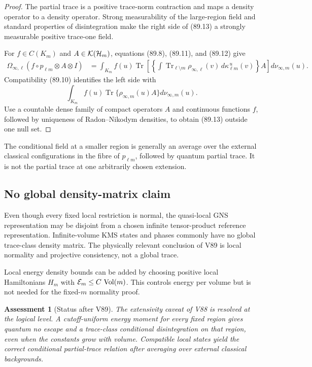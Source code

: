 \documentclass[11pt]{article}
\newtheorem{assessment}[theorem]{Assessment}
\theoremstyle{remark}
\begin{document}
\begin{proof}
The partial trace is a positive trace-norm contraction and maps a
density operator to a density operator.  Strong measurability of the
large-region field and standard properties of disintegration make
the right side of (89.13) a strongly measurable positive trace-one
field.

For \(f\in C(K_m)\) and \(A\in{\cal K}({\cal H}_m)\), equations
(89.8), (89.11), and (89.12) give
\[
 \begin{split}
 \Omega_{\infty,\ell}
 (f\circ p_{\ell m}\otimes A\otimes I)
 &=
 \int_{K_m} f(u)
 \operatorname{Tr}\left[
 \left\{\int
 \operatorname{Tr}_{\ell\setminus m}
 \rho_{\infty,\ell}(v)\,
 d\kappa_{\ell m}^{\,u}(v)\right\}A\right]
 d\nu_{\infty,m}(u).
 \end{split}                                                \tag{89.14}
\]
Compatibility (89.10) identifies the left side with
\[
 \int_{K_m}f(u)
 \operatorname{Tr}\{\rho_{\infty,m}(u)A\}
 d\nu_{\infty,m}(u).
\]
Use a countable dense family of compact operators \(A\) and
continuous functions \(f\), followed by uniqueness of
Radon--Nikodym densities, to obtain (89.13) outside one null set.
\end{proof}

The conditional field at a smaller region is generally an average
over the external classical configurations in the fibre of
\(p_{\ell m}\), followed by quantum partial trace.  It is not the
partial trace at one arbitrarily chosen extension.

\subsection{No global density-matrix claim}

Even though every fixed local restriction is normal, the
quasi-local GNS representation may be disjoint from a chosen
infinite tensor-product reference representation.  Infinite-volume
KMS states and phases commonly have no global trace-class density
matrix.  The physically relevant conclusion of V89 is local
normality and projective consistency, not a global trace.

Local energy density bounds can be added by choosing positive local
Hamiltonians \(H_m\) with
\({\cal E}_m\leq C\,\operatorname{Vol}(m)\).  This controls energy per
volume but is not needed for the fixed-\(m\) normality proof.

\begin{assessment}[Status after V89]
\label{ass:v12v89-status}
The extensivity caveat of V88 is resolved at the logical level.
A cutoff-uniform energy moment for every fixed region gives quantum
no escape and a trace-class conditional disintegration on that
region, even when the constants grow with volume.  Compatible local
states yield the correct conditional partial-trace relation after
averaging over external classical backgrounds.
\end{assessment}
\end{document}
